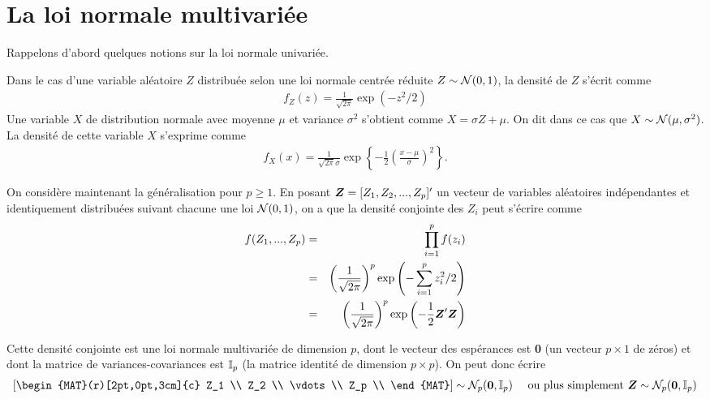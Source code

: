 
\chapter{La loi normale multivariée}
\label{LaLoiNormaleMultivariée}

Rappelons d'abord quelques notions sur la loi normale univariée.

Dans le cas d'une variable aléatoire $Z$ distribuée selon une loi normale centrée réduite $Z\sim\mathcal{N}(0,1)$, la densité de $Z$ s'écrit comme
\begin{eqnarray*}
 f_Z(z) = \frac{1}{\sqrt{2\pi}} \exp(-z^2/2)
\end{eqnarray*}
Une variable $X$ de distribution normale avec moyenne $\mu$ et variance $\sigma^2$ s'obtient comme $X=\sigma Z+\mu$. On dit dans ce cas que $X \sim \mathcal{N} (\mu,\sigma^2)$. La densité de cette variable $X$ s'exprime comme
\begin{eqnarray*}
	f_X(x) =  \frac{1}{\sqrt{2\pi} \sigma} \exp\left\{-\frac{1}{2} \left(\frac{x- \mu}{\sigma}\right)^2\right\}.
\end{eqnarray*}

On considère maintenant la généralisation pour $p\geq 1$.  En posant $\mbox{\boldmath$Z$\unboldmath}=[Z_1, Z_2, ..., Z_p]'$ un vecteur de variables aléatoires indépendantes et identiquement distribuées suivant chacune une loi  $\mathcal{N}(0,1)$, on a que la densité conjointe des $Z_i$ peut  s'écrire comme
\begin{eqnarray}
 f(Z_1, ..., Z_p) &=& \prod_{i=1}^p f(z_i)\nonumber\\
  &=& \left(\frac{1}{\sqrt{2\pi}}\right)^p \exp\left(-\sum_{i=1}^p z_i^2/2\right)\nonumber\\
 &=& \left(\frac{1}{\sqrt{2\pi}}\right)^p \exp\left(-\frac{1}{2} \mbox{\boldmath$Z$\unboldmath}'\mbox{\boldmath$Z$\unboldmath}\right)
\end{eqnarray}

Cette densité conjointe est une loi normale multivariée de dimension $p$, dont le vecteur des espérances est \textbf{0} (un vecteur $p\times 1$ de zéros) et dont la matrice de variances-covariances est $\mathbb{I}_p$ (la matrice identité de dimension $p \times p$). On peut donc écrire
\begin{eqnarray*}
 \left[
\begin{MAT}(r)[2pt,0pt,3cm]{c}
Z_1 \\
Z_2 \\
\vdots \\
Z_p \\
\end{MAT}
\right] \sim \N_p (\textbf{0}, \boI_p) \quad\text{ ou plus simplement }\bo{Z}\sim \N_p (\textbf{0}, \boI_p)
\end{eqnarray*}

